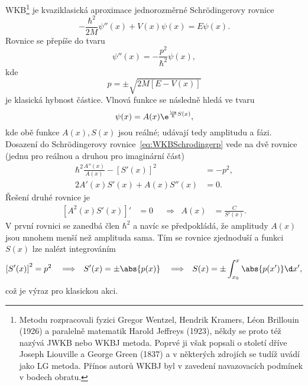 WKB\footnote{
    Metodu rozpracovali fyzici Gregor Wentzel, Hendrik Kramers, Léon Brillouin (1926) a paralelně matematik Harold Jeffreys (1923), někdy se proto též nazývá JWKB nebo WKBJ metoda.
    Poprvé ji však popsali o století dříve Joseph Liouville a George Green (1837) a v některých zdrojích se tudíž uvádí jako LG metoda.
    Přínos autorů WKBJ byl v zavedení navazovacích podmínek v bodech obratu.
}
je kvaziklasická aproximace jednorozměrné Schrödingerovy rovnice
\begin{equation}
    -\frac{\hbar^{2}}{2M}\psi''(x)+V(x)\psi(x)=E\psi(x).
\end{equation}
Rovnice se přepíše do tvaru
\begin{equation}
    \label{eq:WKBSchrodingerp}
    \psi''(x)=-\frac{p^{2}}{\hbar^{2}}\psi(x),
\end{equation}
kde
\begin{equation}
    p=\pm\sqrt{2M\left[E-V(x)\right]}
\end{equation}
je klasická hybnost částice.
Vlnová funkce se následně hledá ve tvaru
\begin{equation}
    \psi(x)=A(x)\e^{\frac{\im}{\hbar}S(x)},
\end{equation}
kde obě funkce $A(x), S(x)$ jsou reálné; udávají tedy amplitudu a fázi.
Dosazení do Schrödingerovy rovnice~\eqref{eq:WKBSchrodingerp} vede na dvě rovnice (jednu pro reálnou a druhou pro imaginární část)
\begin{subequations}
    \begin{align}
        \hbar^{2}\frac{A''(x)}{A(x)}-\left[S'(x)\right]^{2}&=-p^{2},\\
        2A'(x)S'(x)+A(x)S''(x)&=0.
    \end{align}        
\end{subequations}
Řešení druhé rovnice je 
\begin{align}
    \left[A^{2}(x)S'(x)\right]'&=0 && \Longrightarrow & A(x)&=\frac{C}{S'(x)}.
\end{align}
V první rovnici se zanedbá člen $\hbar^{2}$ a navíc se předpokládá, že  amplitudy $A(x)$ jsou mnohem menší než amplituda sama.
Tím se rovnice zjednoduší a funkci $S(x)$ lze nalézt integrováním
\begin{align}
    \left[S'(x)\right]^{2}&=p^{2} && \Longrightarrow & S'(x)&=\pm\abs{p(x)} && \Longrightarrow & S(x)=\pm\int_{x_{0}}^{x}\abs{p(x')}\d x',
\end{align}
což je výraz pro klasickou akci.

